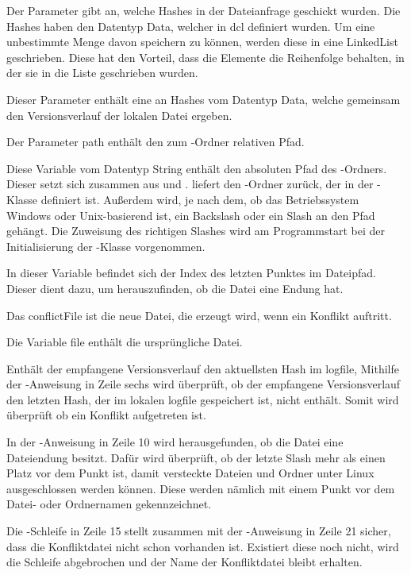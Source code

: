 \begin{description}
	 Der Parameter gibt an, welche Hashes in der Dateianfrage geschickt wurden. Die Hashes haben den Datentyp Data, welcher in \gls{dcl} definiert wurden. Um eine unbestimmte Menge davon speichern zu können, werden diese in eine LinkedList geschrieben. Diese hat den Vorteil, dass die Elemente die Reihenfolge behalten, in der sie in die Liste geschrieben wurden.
	
	 Dieser Parameter enthält eine  an Hashes vom Datentyp Data, welche gemeinsam den Versionsverlauf der lokalen Datei ergeben. 
	
	 Der Parameter path enthält den zum \sblit-Ordner relativen Pfad.
	
	 Diese Variable vom Datentyp String enthält den absoluten Pfad des \sblit-Ordners. Dieser setzt sich zusammen aus  und .  liefert den \sblit-Ordner zurück, der in der -Klasse definiert ist. Außerdem wird, je nach dem, ob das Betriebssystem Windows oder Unix-basierend ist, ein Backslash oder ein Slash an den Pfad gehängt. Die Zuweisung des richtigen Slashes wird am Programmstart bei der Initialisierung der -Klasse vorgenommen.

	 In dieser Variable befindet sich der Index des letzten Punktes im Dateipfad. Dieser dient dazu, um herauszufinden, ob die Datei eine Endung hat.
	
	 Das conflictFile ist die neue Datei, die erzeugt wird, wenn ein Konflikt auftritt.
	
	 Die Variable file enthält die ursprüngliche Datei.
\end{description}
Enthält der empfangene Versionsverlauf den aktuellsten Hash im \gls{logfile}, 
Mithilfe der -Anweisung in Zeile sechs wird überprüft, ob der empfangene Versionsverlauf den letzten Hash, der im lokalen \gls{logfile} gespeichert ist, nicht enthält. Somit wird überprüft ob ein Konflikt aufgetreten ist. 

In der -Anweisung in Zeile 10 wird herausgefunden, ob die Datei eine Dateiendung besitzt. Dafür wird überprüft, ob der letzte Slash mehr als einen Platz vor dem Punkt ist, damit versteckte Dateien und Ordner unter Linux ausgeschlossen werden können. Diese werden nämlich mit einem Punkt vor dem Datei- oder Ordnernamen gekennzeichnet.

Die -Schleife in Zeile 15 stellt zusammen mit der -Anweisung in Zeile 21 sicher, dass die Konfliktdatei nicht schon vorhanden ist. Existiert diese noch nicht, wird die Schleife abgebrochen und der Name der Konfliktdatei bleibt erhalten.